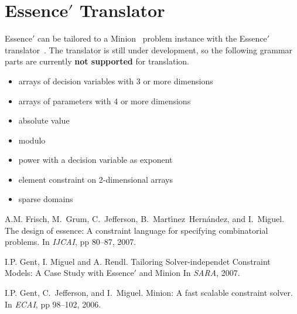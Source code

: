 \documentclass{article}
\begin{document}
\section{{\sc Essence}$'$  Translator}

{\sc Essence}$'$ can be tailored to a {\sc Minion}~\cite{minion} 
problem instance with the {\sc Essence}$'$  translator~\cite{translator}.
The translator is still under development, so the
following grammar parts are currently {\bf not supported} for translation.

\begin{itemize}
  \item arrays of decision variables with 3 or more dimensions 
  \item arrays of parameters with 4 or more dimensions 
  \item absolute value
  \item modulo
  \item power with a decision variable as exponent
  \item element constraint on 2-dimensional arrays 
  \item sparse domains
\end{itemize} 

\begin{thebibliography}{10}
\scriptsize
{}
A.M. Frisch, M.~Grum, C.~Jefferson, B.~Mart\'{\i}nez~Hern{\'a}ndez, and
  I.~Miguel.
\newblock The design of essence: A constraint language for specifying
  combinatorial problems.
\newblock In {\em IJCAI}, pp 80--87, 2007.



I.P. Gent, I. Miguel and A. Rendl.
\newblock Tailoring Solver-independet Constraint Models: A Case Study with Essence$'$ and Minion
\newblock In {\em SARA}, 2007.


I.P. Gent, C.~Jefferson, and I.~Miguel.
\newblock Minion: A fast scalable constraint solver.
\newblock In {\em ECAI}, pp 98--102, 2006.



\end{thebibliography}
\end{document}
